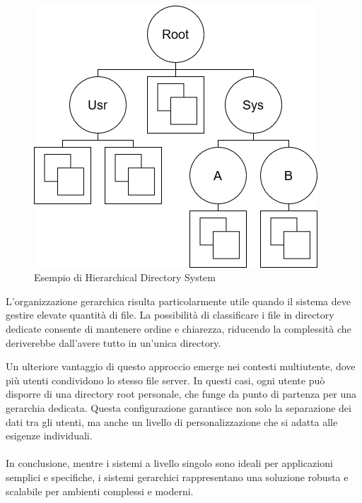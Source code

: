 \documentclass[12pt,a4paper,openright,twoside]{book}
\begin{document}
            \paragraph*{}
            
            \begin{figure}
                \centering
                \includegraphics[width=.5\linewidth]{figures/MultipleDirSystem.png}
                \caption{Esempio di Hierarchical Directory System}
                \label{fig:random-image}
            \end{figure}

            L'organizzazione gerarchica risulta particolarmente utile quando il sistema deve gestire elevate quantità di file. La possibilità di classificare i file in directory dedicate consente di mantenere ordine e chiarezza, riducendo la complessità che deriverebbe dall'avere tutto in un'unica directory.

            Un ulteriore vantaggio di questo approccio emerge nei contesti multiutente, dove più utenti condividono lo stesso file server. In questi casi, ogni utente può disporre di una directory root personale, che funge da punto di partenza per una gerarchia dedicata. Questa configurazione garantisce non solo la separazione dei dati tra gli utenti, ma anche un livello di personalizzazione che si adatta alle esigenze individuali.

            \paragraph*{}

            In conclusione, mentre i sistemi a livello singolo sono ideali per applicazioni semplici e specifiche, i sistemi gerarchici rappresentano una soluzione robusta e scalabile per ambienti complessi e moderni.

        \cite{tanenbaum2015modern}
\end{document}

